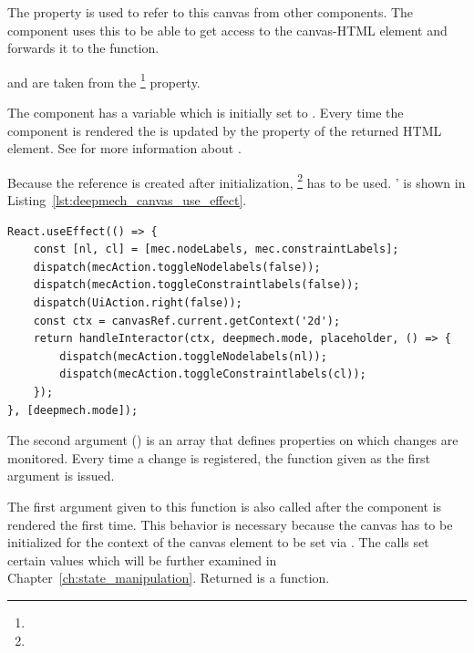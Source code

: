 The  property is used to refer to this canvas from other components.
The  component uses this  to be able to get access to the canvas-HTML element and forwards it to the  function.

 and  are taken from the \footnote{} property.

The  component has a  variable which is initially set to .
Every time the  component is rendered the  is updated by the  property of the returned HTML element.
See  for more information about .

Because the reference is created after initialization,  \footnote{} has to be used.
'  is shown in Listing~\ref{lst:deepmech_canvas_use_effect}.

\begin{lstlisting}[label={lst:deepmech_canvas_use_effect}, caption={The \code{useEffect} function in the \code{DeepmechCanvas} component.}]
React.useEffect(() => {
    const [nl, cl] = [mec.nodeLabels, mec.constraintLabels];
    dispatch(mecAction.toggleNodelabels(false));
    dispatch(mecAction.toggleConstraintlabels(false));
    dispatch(UiAction.right(false));
    const ctx = canvasRef.current.getContext('2d');
    return handleInteractor(ctx, deepmech.mode, placeholder, () => {
        dispatch(mecAction.toggleNodelabels(nl));
        dispatch(mecAction.toggleConstraintlabels(cl));
    });
}, [deepmech.mode]);
\end{lstlisting}

The second argument () is an array that defines properties on which changes are monitored.
Every time a change is registered, the function given as the first argument is issued.

The first argument given to this function is also called after the component is rendered the first time.
This behavior is necessary because the canvas has to be initialized for the context of the canvas element to be set via .
The  calls set certain values which will be further examined in Chapter~\ref{ch:state_manipulation}.
Returned is a  function.

